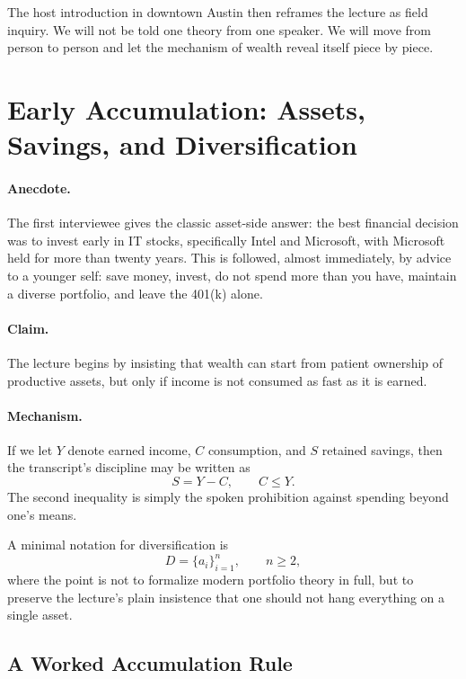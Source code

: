 The host introduction in downtown Austin then reframes the lecture as field inquiry. We will not be told one theory from one speaker. We will move from person to person and let the mechanism of wealth reveal itself piece by piece.

\section{Early Accumulation: Assets, Savings, and Diversification}

\paragraph{Anecdote.}
The first interviewee gives the classic asset-side answer: the best financial decision was to invest early in IT stocks, specifically Intel and Microsoft, with Microsoft held for more than twenty years. This is followed, almost immediately, by advice to a younger self: save money, invest, do not spend more than you have, maintain a diverse portfolio, and leave the 401(k) alone.

\paragraph{Claim.}
The lecture begins by insisting that wealth can start from patient ownership of productive assets, but only if income is not consumed as fast as it is earned.

\paragraph{Mechanism.}
If we let $Y$ denote earned income, $C$ consumption, and $S$ retained savings, then the transcript's discipline may be written as
\begin{equation}
S = Y - C, \qquad C \le Y.
\end{equation}
The second inequality is simply the spoken prohibition against spending beyond one's means.

A minimal notation for diversification is
\begin{equation}
D=\{a_i\}_{i=1}^{n}, \qquad n \ge 2,
\end{equation}
where the point is not to formalize modern portfolio theory in full, but to preserve the lecture's plain insistence that one should not hang everything on a single asset.

\subsection{A Worked Accumulation Rule}


